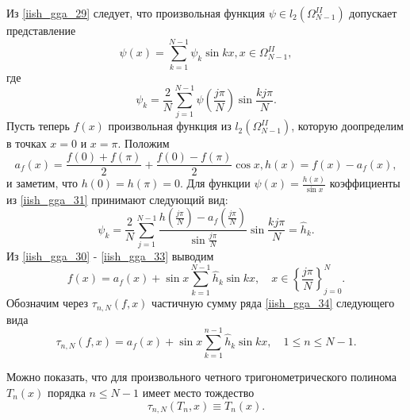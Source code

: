 Из \eqref{iish_gga_29} следует, что произвольная функция $\psi \in l_2(\Omega_{N-1}^{II})$ допускает представление
\begin{equation}
  \psi(x) = \sum\limits_{k=1}^{N-1} \psi_k \sin kx, x \in \Omega_{N-1}^{II}, \label{iish_gga_30}
\end{equation}
где
\begin{equation}
  \psi_k = \frac2N \sum\limits_{j=1}^{N-1} \psi(\frac{j\pi}{N}) \sin \frac{kj\pi}{N}. \label{iish_gga_31}
\end{equation}
Пусть теперь $f(x)$ произвольная функция из $l_2(\Omega_{N-1}^{II})$, которую доопределим в точках $x = 0$ и  $x = \pi$.
Положим
\begin{equation}
  a_f(x) = \frac{f(0) + f(\pi)}{2} + \frac{f(0) - f(\pi)}{2}\cos x, h(x) = f(x) - a_f(x), \label{iish_gga_32}
\end{equation}
и заметим, что $h(0) = h(\pi) = 0$. Для функции $\psi(x) = \frac{h(x)}{\sin x}$ коэффициенты из \eqref{iish_gga_31} принимают
следующий вид:
\begin{equation}
  \psi_k=\frac2N\sum\limits_{j=1}^{N-1}\frac{h(\frac{j\pi}{N})-a_f(\frac{j\pi}{N})}{\sin\frac{j\pi}{N}}\sin\frac{kj\pi}{N} = \hat{h}_k. \label{iish_gga_33}
\end{equation}
Из \eqref{iish_gga_30} - \eqref{iish_gga_33} выводим
\begin{equation}
  f(x) = a_f(x) + \sin x \sum\limits_{k=1}^{N-1} \hat{h}_k \sin kx, \quad x \in \left\{ \frac{j\pi}{N} \right\}_{j=0}^{N}. \label{iish_gga_34}
\end{equation}
Обозначим через $\tau_{n,N}(f,x)$ частичную сумму ряда \eqref{iish_gga_34} следующего вида
\begin{equation}
  \tau_{n,N}(f,x) = a_f(x) + \sin x \sum\limits_{k=1}^{n-1} \hat{h}_k \sin kx, \quad 1 \leq n \leq N-1. \label{iish_gga_35}
\end{equation}

Можно показать, что для произвольного четного тригонометрического полинома $T_n(x)$ порядка $n \leq N-1$ имеет место тождество
\begin{equation}
  \tau_{n,N}(T_n, x) \equiv T_n(x). \label{iish_gga_36}
\end{equation}

